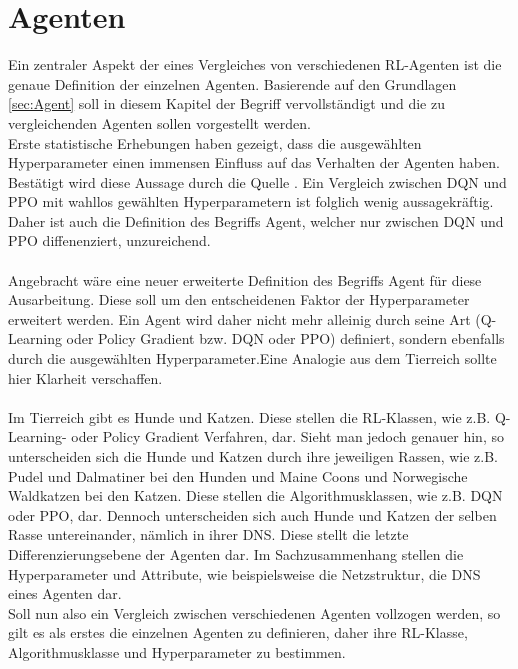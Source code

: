 \chapter{Agenten}
Ein zentraler Aspekt der eines Vergleiches von verschiedenen RL-Agenten ist die genaue Definition der einzelnen Agenten. Basierende auf den Grundlagen \ref{sec:Agent} soll in diesem Kapitel der Begriff vervollständigt und die zu vergleichenden Agenten sollen vorgestellt werden.\\
Erste statistische Erhebungen haben gezeigt, dass die ausgewählten Hyperparameter einen immensen Einfluss auf das Verhalten der Agenten haben. Bestätigt wird diese Aussage durch die Quelle \cite{Sutton1998}. Ein Vergleich zwischen DQN und PPO mit wahllos gewählten Hyperparametern ist folglich wenig aussagekräftig. Daher ist auch die Definition des Begriffs Agent, welcher nur zwischen DQN und PPO diffenenziert, unzureichend.\\
\\Angebracht wäre eine neuer erweiterte Definition des Begriffs Agent für diese Ausarbeitung. Diese soll um den entscheidenen Faktor der Hyperparameter erweitert werden. Ein Agent wird daher nicht mehr alleinig durch seine Art (Q-Learning oder Policy Gradient bzw. DQN oder PPO) definiert, sondern ebenfalls durch die ausgewählten Hyperparameter.Eine Analogie aus dem Tierreich sollte hier Klarheit verschaffen.\\
\\Im Tierreich gibt es Hunde und Katzen. Diese stellen die RL-Klassen, wie z.B. Q-Learning- oder Policy Gradient Verfahren, dar. Sieht man jedoch genauer hin, so unterscheiden sich die Hunde und Katzen durch ihre jeweiligen Rassen, wie z.B. Pudel und Dalmatiner bei den Hunden und Maine Coons und Norwegische Waldkatzen bei den Katzen. Diese stellen die Algorithmusklassen, wie z.B. DQN oder PPO, dar. Dennoch unterscheiden sich auch Hunde und Katzen der selben Rasse untereinander, nämlich in ihrer DNS. Diese stellt die letzte Differenzierungsebene der Agenten dar. Im Sachzusammenhang stellen die Hyperparameter und Attribute, wie beispielsweise die Netzstruktur, die DNS eines Agenten dar.\\
Soll nun also ein Vergleich zwischen verschiedenen Agenten vollzogen werden, so gilt es als erstes die einzelnen Agenten zu definieren, daher ihre RL-Klasse, Algorithmusklasse und Hyperparameter zu bestimmen.

